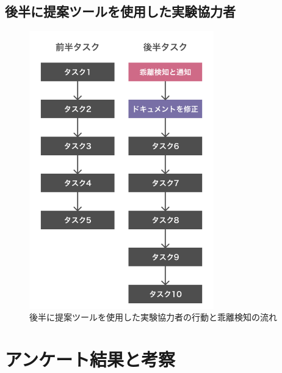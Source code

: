 \subsection{後半に提案ツールを使用した実験協力者}

\begin{figure}[H]
    \centering
    \includegraphics[width=8cm]{images/UserB.png}
    \caption{後半に提案ツールを使用した実験協力者の行動と乖離検知の流れ}
    \label{userb}
\end{figure}

\section{アンケート結果と考察}